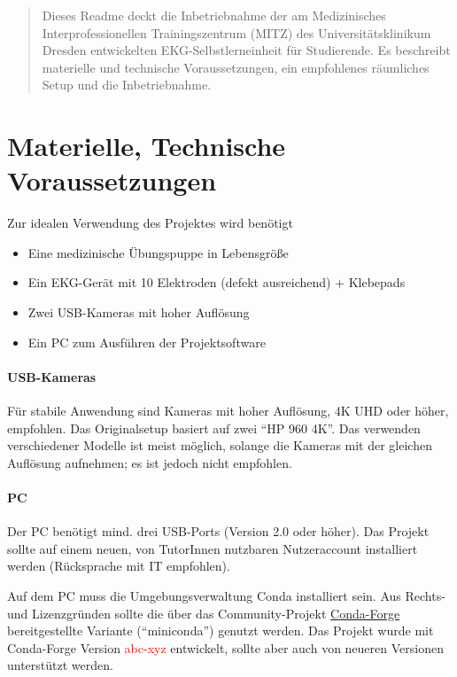 \documentclass[a4paper]{article}
\newcommand{\warn}[1]{\textcolor{red}{#1}}
\begin{document}
\begin{abstract}
    Dieses Readme deckt die Inbetriebnahme der am Medizinisches Interprofessionellen Trainingszentrum (MITZ) des Universitätsklinikum Dresden entwickelten EKG-Selbstlerneinheit für Studierende. Es beschreibt materielle und technische Voraussetzungen, ein empfohlenes räumliches Setup und die Inbetriebnahme.
\end{abstract}

\section{Materielle, Technische Voraussetzungen}
\label{sec:prerequisites}
Zur idealen Verwendung des Projektes wird benötigt
\begin{itemize}
    \item Eine medizinische Übungspuppe in Lebensgröße
    \item Ein EKG-Gerät mit 10 Elektroden (defekt ausreichend) + Klebepads
    \item Zwei USB-Kameras mit hoher Auflösung
    \item Ein PC zum Ausführen der Projektsoftware
\end{itemize}

\paragraph{USB-Kameras}
Für stabile Anwendung sind Kameras mit hoher Auflösung, 4K UHD oder höher, empfohlen. Das Originalsetup basiert auf zwei \enquote{HP 960 4K}. Das verwenden verschiedener Modelle ist meist möglich, solange die Kameras mit der gleichen Auflösung aufnehmen; es ist jedoch nicht empfohlen.

\paragraph{PC}
Der PC benötigt mind. drei USB-Ports (Version 2.0 oder höher). Das Projekt sollte auf einem neuen, von TutorInnen nutzbaren Nutzeraccount installiert werden (Rücksprache mit IT empfohlen).

Auf dem PC muss die Umgebungsverwaltung Conda installiert sein. Aus Rechts- und Lizenzgründen sollte die über das Community-Projekt \href{https://conda-forge.org/}{Conda-Forge} bereitgestellte Variante (\enquote{miniconda}) genutzt werden. Das Projekt wurde mit Conda-Forge Version \warn{abc-xyz} entwickelt, sollte aber auch von neueren Versionen unterstützt werden.
\end{document}
